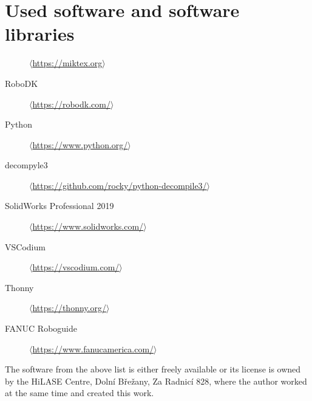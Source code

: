﻿\chapter{Used software and software libraries \label{ch:ApendSW}}



\begin{description}
    \item[\LaTeXe]
            \href{https://miktex.org/}
            {$\langle$https://miktex.org$\rangle$}
            
    \item[RoboDK]
            \href{https://robodk.com/}
            {$\langle$https://robodk.com/$\rangle$}
            
    \item[Python]
            \href{https://www.python.org/}
            {$\langle$https://www.python.org/$\rangle$}
    
    \item[decompyle3]
            \href{https://github.com/rocky/python-decompile3/}
            {$\langle$https://github.com/rocky/python-decompile3/$\rangle$}
            
    \item[SolidWorks Professional 2019]
            \href{https://www.solidworks.com/}
            {$\langle$https://www.solidworks.com/$\rangle$}
            
    \item[VSCodium]
            \href{https://vscodium.com/}
            {$\langle$https://vscodium.com/$\rangle$}
            
    \item[Thonny]
            \href{https://thonny.org/}
            {$\langle$https://thonny.org/$\rangle$}
            
    \item[FANUC Roboguide]
            \href{https://www.fanucamerica.com/products/robots/robot-simulation-software-FANUC-ROBOGUIDE}
            {$\langle$https://www.fanucamerica.com/$\rangle$}
\end{description}

The software from the above list is either freely available or its license is owned by the HiLASE Centre, Dolní Břežany, Za Radnicí 828, where the author worked at the same time and created this work.




